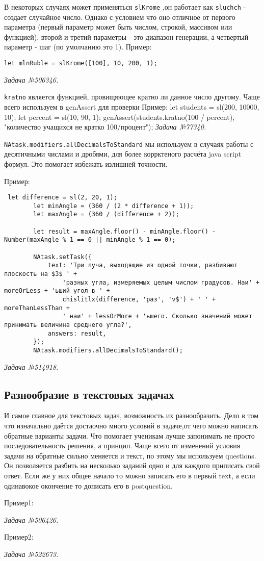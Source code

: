 В некоторых случаях может применяться \texttt{slKrome} ,он работает как \texttt{sluchch} - создает случайное число. Однако с условием что оно  отличное от
		первого параметра (первый параметр может быть числом, строкой, массивом или функцией),
		второй и третий параметры - это диапазон генерации, а четвертый параметр - шаг (по умолчанию это 1).
Пример:
\begin{lstlisting}
let mlnRuble = slKrome([100], 10, 200, 1);
\end{lstlisting}
\textsl{Задача №506346.}

\texttt{kratno} является функцией, провищяющее кратно ли данное число другому. Чаще всего используем в genAssert для проверки
Пример:
let students = sl(200, 10000, 10);
let percent = sl(10, 90, 1);
genAssert(students.kratno(100 / percent), "количество учащихся не кратко 100/процент");
\textsl{Задача №77340.}

\texttt{NAtask.modifiers.allDecimalsToStandard} мы используем в случаях работы с десятичными числами и дробями, для более коррктеного расчёта java script формул.
 Это помогает избежать излишней точности.

Пример:
\begin{lstlisting}
 let difference = sl(2, 20, 1);
        let minAngle = (360 / (2 * difference + 1));
        let maxAngle = (360 / (difference + 2));

        let result = maxAngle.floor() - minAngle.floor() - Number(maxAngle % 1 == 0 || minAngle % 1 == 0);

        NAtask.setTask({
            text: 'Три луча, выходящие из одной точки, разбивают плоскость на $3$ ' +
                'разных угла, измеряемых целым числом градусов. Наи' + moreOrLess + 'ьший угол в ' +
                chislitlx(difference, 'раз', 'v$') + ' ' + moreThanLessThan +
                ' наи' + lessOrMore + 'ьшего. Сколько значений может принимать величина среднего угла?',
            answers: result,
        });
        NAtask.modifiers.allDecimalsToStandard();
\end{lstlisting}       
\textsl{Задача №514918.}

\subsection{Разнообразие в текстовых задачах}
И самое главное для текстовых задач, возможность их разнообразить. Дело в том что изначально даётся достаочно много условий в задаче,от чего можно написать обратные варианты задачи. Что помогает ученикам лучше запонимать не просто последовательность решения, а принцип.
Чаще всего от изменений условия задачи на обратные сильно меняется и текст, по этому мы используем questions. Он позволяется разбить на несколько заданий одно и для каждого приписать свой ответ. Если же у них общее начало то можно записать его в первый text, а если одинавокое окончение то 
дописать его в postquestion.

Пример1: 
 
\textsl{Задача №506426.}

Пример2:
 
\textsl{Задача №522673.}
